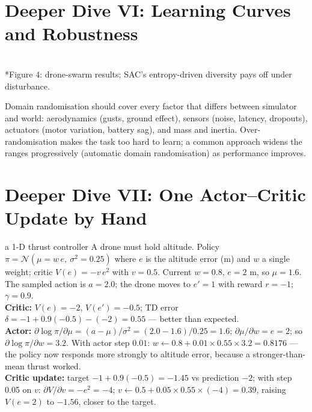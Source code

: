 \documentclass[11pt]{article}
\begin{document}
\section{Deeper Dive VI: Learning Curves and Robustness}
\begin{center}\\*{\small\color{GreyN}Figure 4: drone-swarm results; SAC's entropy-driven diversity pays off under disturbance.}\end{center}
Domain randomisation should cover every factor that differs between simulator and world: aerodynamics (gusts, ground effect), sensors (noise, latency, dropouts), actuators (motor variation, battery sag), and mass and inertia. Over-randomisation makes the task too hard to learn; a common approach widens the ranges progressively (automatic domain randomisation) as performance improves.

\section{Deeper Dive VII: One Actor--Critic Update by Hand}
\begin{example}{a 1-D thrust controller}
A drone must hold altitude. Policy $\pi=\mathcal N(\mu=w\,e,\ \sigma^2=0.25)$ where $e$ is the altitude error (m) and $w$ a single weight; critic $V(e)=-v\,e^2$ with $v=0.5$. Current $w=0.8$, $e=2$ m, so $\mu=1.6$. The sampled action is $a=2.0$; the drone moves to $e'=1$ with reward $r=-1$; $\gamma=0.9$.\\
\textbf{Critic:} $V(e)=-2$, $V(e')=-0.5$; TD error $\delta=-1+0.9(-0.5)-(-2)=0.55$ --- better than expected.\\
\textbf{Actor:} $\partial\log\pi/\partial\mu=(a-\mu)/\sigma^2=(2.0-1.6)/0.25=1.6$; $\partial\mu/\partial w=e=2$; so $\partial\log\pi/\partial w=3.2$. With actor step $0.01$: $w\leftarrow0.8+0.01\times0.55\times3.2=0.8176$ --- the policy now responds more strongly to altitude error, because a stronger-than-mean thrust worked.\\
\textbf{Critic update:} target $-1+0.9(-0.5)=-1.45$ vs prediction $-2$; with step 0.05 on $v$: $\partial V/\partial v=-e^2=-4$; $v\leftarrow0.5+0.05\times0.55\times(-4)=0.39$, raising $V(e=2)$ to $-1.56$, closer to the target.
\end{example}
\end{document}

